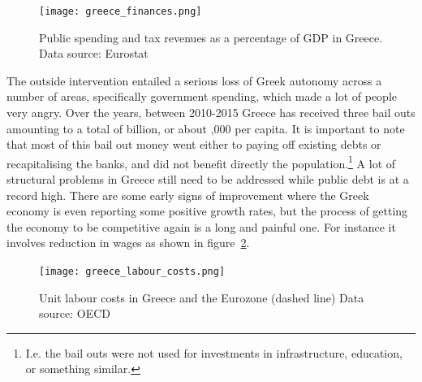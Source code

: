 \documentclass{tufte-handout}
\begin{document}
\begin{figure} \centering
    \texttt{[image: greece\_finances.png]}
    \caption{Public spending and tax revenues as a percentage of GDP in Greece. Data source: Eurostat}
    \label{fig:finance}
\end{figure}

The outside intervention entailed a serious loss of Greek autonomy across a number of areas, specifically government spending, which made a lot of people very angry. 
Over the years, between 2010-2015 Greece has received three bail outs amounting to a total of 
 billion, or about ,000 per capita. 
It is important to note that most of this bail out money went either to paying off existing debts or recapitalising the banks, and did not benefit directly the population.\footnote{I.e. the bail outs were not used for investments in infrastructure, education, or something similar.}
A lot of structural problems in Greece still need to be addressed while public debt is at a record high. 
There are some early signs of improvement where the Greek economy is even reporting some positive growth rates, but the process of getting the economy to be competitive again is a long and painful one. 
For instance it involves reduction in wages as shown in figure~\ref{fig:labour_costs}.%
\begin{figure} \centering
    \texttt{[image: greece\_labour\_costs.png]}
    \caption{Unit labour costs in Greece and the Eurozone (dashed line) Data source: OECD}
    \label{fig:labour_costs}
\end{figure}

\clearpage
\end{document}
